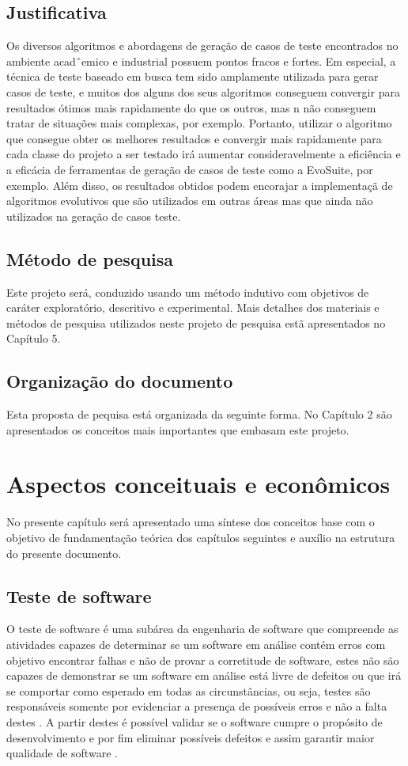 \documentclass[
	12pt,				%
	oneside,			%
	a4paper,			%
	english,			%
	brazil				%
	]{abntex2ppgsi}
\begin{document}
\section{Justificativa}
Os diversos algoritmos e abordagens de geração de casos de teste encontrados no ambiente acadˆemico e industrial possuem pontos fracos e fortes. Em especial, a técnica de teste baseado em busca tem sido amplamente utilizada para gerar casos de teste, e muitos dos alguns dos seus algoritmos conseguem convergir para resultados  ótimos mais rapidamente do que os outros, mas n não conseguem tratar de situações mais complexas, por exemplo. Portanto, utilizar o algoritmo que consegue obter os melhores resultados e convergir mais rapidamente para cada classe do projeto a ser testado irá aumentar consideravelmente a eficiência e a eficácia de ferramentas de geração de casos de teste como a EvoSuite, por exemplo. Além disso, os resultados obtidos podem encorajar a implementaçã de algoritmos evolutivos que são utilizados em outras áreas mas que ainda não utilizados na geração de casos teste.

\section{Método de pesquisa}
Este projeto será, conduzido usando um método indutivo com objetivos de caráter exploratório, descritivo e experimental. Mais detalhes dos materiais e métodos de pesquisa utilizados neste projeto de pesquisa estã apresentados no Capítulo 5.

\section{Organização do documento}
Esta proposta de pequisa está organizada da seguinte forma. No Capítulo 2 são apresentados os conceitos mais importantes que embasam este projeto.

\chapter{Aspectos conceituais e econômicos}
No presente capítulo será apresentado uma síntese dos conceitos base com o objetivo de fundamentação teórica dos capítulos seguintes e auxílio na estrutura do presente documento.

\section{Teste de software}
O teste de software é uma subárea da engenharia de software que compreende as atividades capazes de determinar se um software em análise contém erros \cite{gerhart1975} com objetivo encontrar falhas e não de provar a corretitude de software, estes não são capazes de demonstrar se um software em análise está livre de defeitos ou que irá se comportar como esperado em todas as circunstâncias, ou seja, testes são responsáveis somente por evidenciar a presença de possíveis erros e não a falta destes \cite{pfleeger2010}. A partir destes é possível validar se o software cumpre o propósito de desenvolvimento e por fim eliminar possíveis defeitos e assim garantir maior qualidade de software \cite{Sommerville2010}. 
\end{document}
